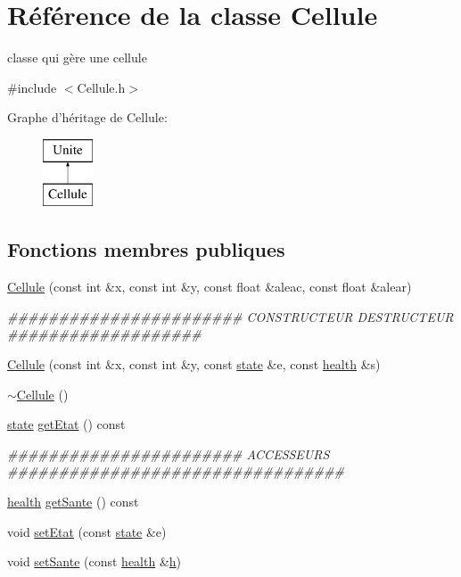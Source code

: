 \hypertarget{classCellule}{
\section{Référence de la classe Cellule}
\label{classCellule}
}


classe qui gère une cellule  




{\ttfamily \#include $<$Cellule.h$>$}

Graphe d'héritage de Cellule:\begin{figure}[H]
\begin{center}
\leavevmode
\includegraphics[height=2.000000cm]{classCellule}
\end{center}
\end{figure}
\subsection*{Fonctions membres publiques}
\begin{DoxyCompactItemize}
\item 
\hyperlink{classCellule_a1985e23eecde218a2d8431347282ef6c}{Cellule} (const int \&x, const int \&y, const float \&aleac, const float \&alear)
\begin{DoxyCompactList}\small\item\em \#\#\#\#\#\#\#\#\#\#\#\#\#\#\#\#\#\#\#\#\#\#\# CONSTRUCTEUR DESTRUCTEUR \#\#\#\#\#\#\#\#\#\#\#\#\#\#\#\#\#\#\# \end{DoxyCompactList}\item 
\hyperlink{classCellule_ab615eb1145058277a6ee7da3c6815e96}{Cellule} (const int \&x, const int \&y, const \hyperlink{enum_8h_adc6e5733fc3c22f0a7b2914188c49c90}{state} \&e, const \hyperlink{enum_8h_ae2f10db0fed275ae9f323a3c41243971}{health} \&s)
\item 
\hyperlink{classCellule_a62c79c012c471f8dc74714c3262a696c}{$\sim$Cellule} ()
\item 
\hyperlink{enum_8h_adc6e5733fc3c22f0a7b2914188c49c90}{state} \hyperlink{classCellule_acf25adc7514216fa27eb2bbca16e5575}{getEtat} () const 
\begin{DoxyCompactList}\small\item\em \#\#\#\#\#\#\#\#\#\#\#\#\#\#\#\#\#\#\#\#\#\#\# ACCESSEURS \#\#\#\#\#\#\#\#\#\#\#\#\#\#\#\#\#\#\#\#\#\#\#\#\#\#\#\#\#\#\#\#\# \end{DoxyCompactList}\item 
\hyperlink{enum_8h_ae2f10db0fed275ae9f323a3c41243971}{health} \hyperlink{classCellule_a74be2a324414e10c1ce1b447946b05a8}{getSante} () const 
\item 
void \hyperlink{classCellule_a028c936a6e6d8ac24877690ff87a70e2}{setEtat} (const \hyperlink{enum_8h_adc6e5733fc3c22f0a7b2914188c49c90}{state} \&e)
\item 
void \hyperlink{classCellule_a1dfb3501e51f86aba8b5e0eb191b6a3a}{setSante} (const \hyperlink{enum_8h_ae2f10db0fed275ae9f323a3c41243971}{health} \&\hyperlink{classUnite_1_1h}{h})
\end{DoxyCompactItemize}
